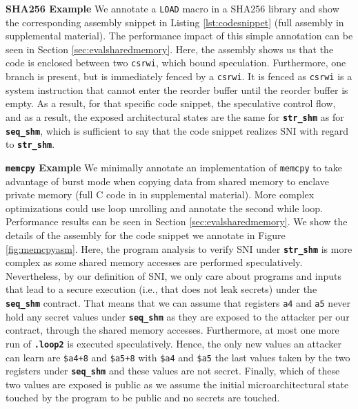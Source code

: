 \noindent\textbf{SHA256 Example}
We annotate a \texttt{LOAD} macro in a SHA256 library and show the corresponding assembly snippet in Listing \ref{lst:codesnippet} (full assembly in supplemental material).
The performance impact of this simple annotation can be seen in Section \ref{sec:evalsharedmemory}.
Here, the assembly shows us that the code is enclosed between two \texttt{csrwi}, which bound speculation.
Furthermore, one branch is present, but is immediately fenced by a \texttt{csrwi}. 
It is fenced as \texttt{csrwi} is a system instruction that cannot enter the reorder buffer until the reorder buffer is empty.
As a result, for that specific code snippet, the speculative control flow, and as a result, the exposed architectural states are the same for \textbf{\texttt{str\_shm}} as for \textbf{\texttt{seq\_shm}}, which is sufficient to say that the code snippet realizes SNI with regard to \textbf{\texttt{str\_shm}}.

\noindent\textbf{\texttt{memcpy} Example}
We minimally annotate an implementation of \texttt{memcpy} to take advantage of burst mode when copying data from shared memory to enclave private memory (full C code in in supplemental material).
More complex optimizations could use loop unrolling and annotate the second while loop.
Performance results can be seen in Section \ref{sec:evalsharedmemory}.
We show the details of the assembly for the code snippet we annotate in Figure \ref{fig:memcpyasm}.
Here, the program analysis to verify SNI under \textbf{\texttt{str\_shm}} is more complex as some shared memory accesses are performed speculatively.
Nevertheless, by our definition of SNI, we only care about programs and inputs that lead to a secure execution (i.e., that does not leak secrets) under the \textbf{\texttt{seq\_shm}} contract.
That means that we can assume that registers \texttt{a4} and \texttt{a5} never hold any secret values under \textbf{\texttt{seq\_shm}} as they are exposed to the attacker per our contract, through the shared memory accesses.
Furthermore, at most one more run of \textbf{\texttt{.loop2}} is executed speculatively.
Hence, the only new values an attacker can learn are \texttt{\$a4+8} and \texttt{\$a5+8} with \texttt{\$a4} and \texttt{\$a5} the last values taken by the two registers under \textbf{\texttt{seq\_shm}} and these values are not secret.
Finally, which of these two values are exposed is public as we assume the initial microarchitectural state touched by the program to be public and no secrets are touched.

